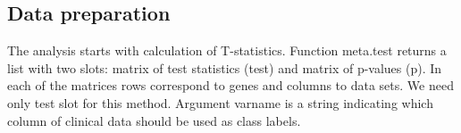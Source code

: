 \documentclass[a4paper]{report}
\begin{document}
\subsection*{Data preparation}
The analysis starts with calculation of T-statistics. Function {\ttfamily meta.test} returns a list with two slots: matrix of test statistics ({\ttfamily test}) and matrix of p-values ({\ttfamily p}). In each of the matrices rows correspond to genes and columns to data sets. We need only {\ttfamily test} slot for this method. Argument {\ttfamily varname} is a string indicating which column of clinical data should be used as class labels. 
\begin{Schunk}
\end{Schunk}
\end{document}

